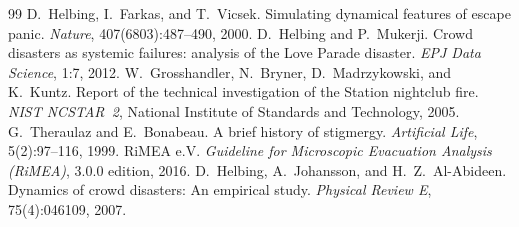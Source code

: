 \documentclass[sigconf,nonacm]{acmart}
\begin{document}
\begin{thebibliography}{99}
 D.~Helbing, I.~Farkas, and T.~Vicsek. Simulating dynamical features of escape panic. \emph{Nature}, 407(6803):487--490, 2000.
 D.~Helbing and P.~Mukerji. Crowd disasters as systemic failures: analysis of the Love Parade disaster. \emph{EPJ Data Science}, 1:7, 2012.
 W.~Grosshandler, N.~Bryner, D.~Madrzykowski, and K.~Kuntz. Report of the technical investigation of the Station nightclub fire. \emph{NIST NCSTAR~2}, National Institute of Standards and Technology, 2005.
 G.~Theraulaz and E.~Bonabeau. A brief history of stigmergy. \emph{Artificial Life}, 5(2):97--116, 1999.
 RiMEA e.V. \emph{Guideline for Microscopic Evacuation Analysis (RiMEA)}, 3.0.0 edition, 2016.
 D.~Helbing, A.~Johansson, and H.~Z.~Al-Abideen. Dynamics of crowd disasters: An empirical study. \emph{Physical Review E}, 75(4):046109, 2007.
\end{thebibliography}
\end{document}
